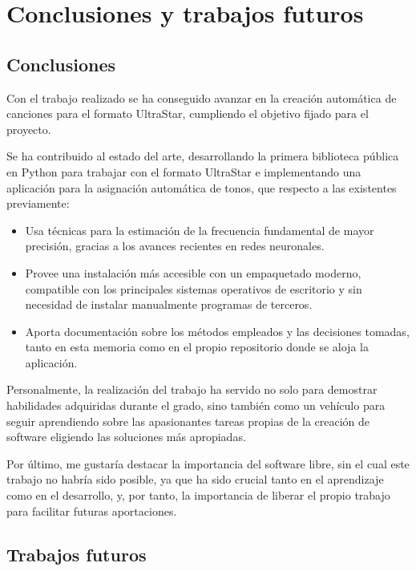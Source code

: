 \chapter{Conclusiones y trabajos futuros}

\section{Conclusiones}

Con el trabajo realizado se ha conseguido avanzar en la creación automática de canciones para el formato UltraStar, cumpliendo el objetivo fijado para el proyecto.

Se ha contribuido al estado del arte, desarrollando la primera biblioteca pública en Python para trabajar con el formato UltraStar e implementando una aplicación para la asignación automática de tonos, que respecto a las existentes previamente: 

\begin{itemize}
	\item{Usa técnicas para la estimación de la frecuencia fundamental de mayor precisión, gracias a los avances recientes en redes neuronales.}
	\item{Provee una instalación más accesible con un empaquetado moderno, compatible con los principales sistemas operativos de escritorio y sin necesidad de instalar manualmente programas de terceros.}
	\item{Aporta documentación sobre los métodos empleados y las decisiones tomadas, tanto en esta memoria como en el propio repositorio donde se aloja la aplicación.}
\end{itemize}


Personalmente, la realización del trabajo ha servido no solo para demostrar habilidades adquiridas durante el grado, sino también como un vehículo para seguir aprendiendo sobre las apasionantes tareas propias de la creación de software eligiendo las soluciones más apropiadas.

Por último, me gustaría destacar la importancia del software libre, sin el cual este trabajo no habría sido posible, ya que ha sido crucial tanto en el aprendizaje como en el desarrollo, y, por tanto, la importancia de liberar el propio trabajo para facilitar futuras aportaciones.

\section{Trabajos futuros}

